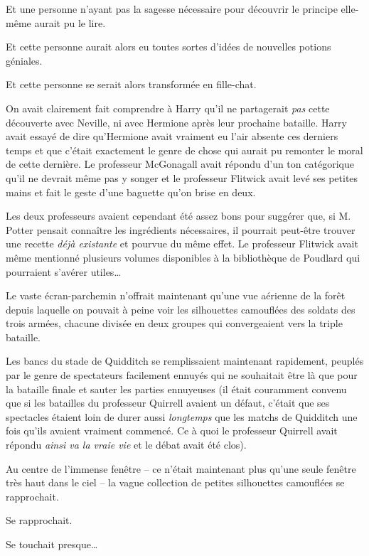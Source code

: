 Et une personne n'ayant pas la sagesse nécessaire pour découvrir le principe elle-même aurait pu le lire.

Et cette personne aurait alors eu toutes sortes d'idées de nouvelles potions géniales.

Et cette personne se serait alors transformée en fille-chat.

On avait clairement fait comprendre à Harry qu'il ne partagerait \emph{pas} cette découverte avec Neville, ni avec Hermione après leur prochaine bataille.
Harry avait essayé de dire qu'Hermione avait vraiment eu l'air absente ces derniers temps et que c'était exactement le genre de chose qui aurait pu remonter le moral de cette dernière.
Le professeur McGonagall avait répondu d'un ton catégorique qu'il ne devrait même pas y songer et le professeur Flitwick avait levé ses petites mains et fait le geste d'une baguette qu'on brise en deux.

Les deux professeurs avaient cependant été assez bons pour suggérer que, si M. Potter pensait connaître les ingrédients nécessaires, il pourrait peut-être trouver une recette \emph{déjà existante} et pourvue du même effet.
Le professeur Flitwick avait même mentionné plusieurs volumes disponibles à la bibliothèque de Poudlard qui pourraient s'avérer utiles…

\later

Le vaste écran-parchemin n'offrait maintenant qu'une vue aérienne de la forêt depuis laquelle on pouvait à peine voir les silhouettes camouflées des soldats des trois armées, chacune divisée en deux groupes qui convergeaient vers la triple bataille.

Les bancs du stade de Quidditch se remplissaient maintenant rapidement, peuplés par le genre de spectateurs facilement ennuyés qui ne souhaitait être là que pour la bataille finale et sauter les parties ennuyeuses (il était couramment convenu que si les batailles du professeur Quirrell avaient un défaut, c'était que ses spectacles étaient loin de durer aussi \emph{longtemps} que les matchs de Quidditch une fois qu'ils avaient vraiment commencé.
Ce à quoi le professeur Quirrell avait répondu \emph{ainsi va la vraie vie} et le débat avait été clos).

Au centre de l'immense fenêtre -- ce n'était maintenant plus qu'une seule fenêtre très haut dans le ciel -- la vague collection de petites silhouettes camouflées se rapprochait.

Se rapprochait.

Se touchait presque…

